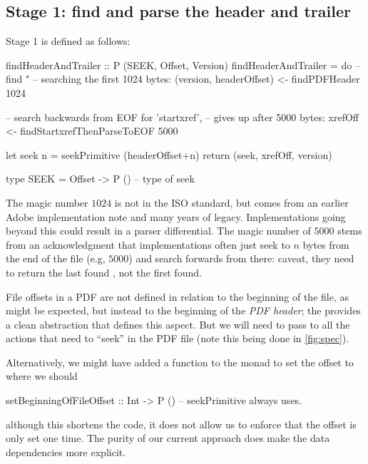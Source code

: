 \subsection{Stage 1: find and parse the header and trailer}
\label{sec:stage-1}

Stage 1 is defined as follows:
\begin{code}
findHeaderAndTrailer :: P (SEEK, Offset, Version)
findHeaderAndTrailer =
    do
    -- find "%
    -- searching the first 1024 bytes:
    (version, headerOffset) <- findPDFHeader 1024

    -- search backwards from EOF for 'startxref',
    -- gives up after 5000 bytes:
    xrefOff <- findStartxrefThenParseToEOF 5000
    
    let seek n = seekPrimitive (headerOffset+n)
    return (seek, xrefOff, version)
    
type SEEK = Offset -> P () -- type of seek
\end{code}

The magic number $1024$ is not in the ISO standard, but comes from an earlier Adobe implementation note and many years of legacy.  Implementations going beyond this could result in a parser differential.
The magic number of $5000$ stems from an acknowledgment that implementations often just seek to 
$n$ bytes from the end of the file (e.g, $5000$) and search forwards from there: caveat, they need to return the last found , not the first found.

File offsets in a PDF are not defined in relation to the beginning of
the file, as might be expected, but instead to the beginning of the
\emph{PDF header};
%
the  provides a clean abstraction that defines this
aspect.
%
But we will need to pass  to all the actions that need to
``seek'' in the PDF file (note this being done in \cref{fig:spec}).

Alternatively, we might have added a function to the monad to set
the offset to where we should 
\begin{codeNoExecute}
setBeginningOfFileOffset :: Int -> P ()  -- seekPrimitive always uses.
\end{codeNoExecute}
although this shortens the code, it does not allow us to enforce that
the offset is only set one time.  The purity of our current approach does make
the data dependencies more explicit.

